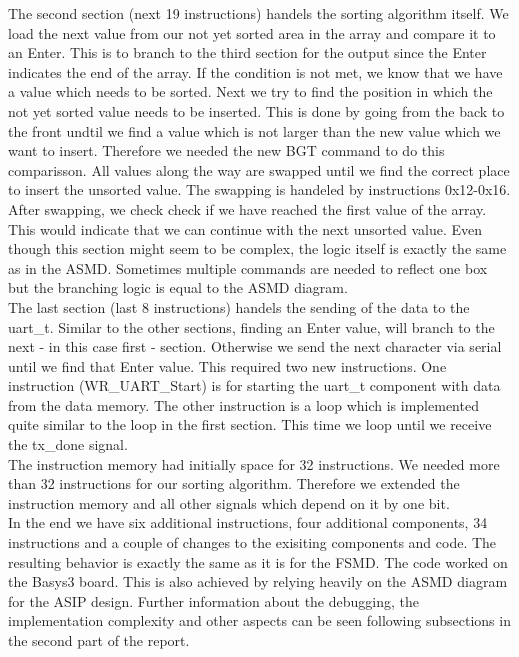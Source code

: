 \documentclass[conference]{IEEEtran}
\begin{document}
The second section (next 19 instructions) handels the sorting algorithm itself. We load the next value from our not yet sorted area in the array and compare it to an Enter. This is to branch to the third section for the output since the Enter indicates the end of the array. If the condition is not met, we know that we have a value which needs to be sorted. Next we try to find the position in which the not yet sorted value needs to be inserted. This is done by going from the back to the front undtil we find a value which is not larger than the new value which we want to insert. Therefore we needed the new BGT command to do this comparisson. All values along the way are swapped until we find the correct place to insert the unsorted value. The swapping is handeled by instructions 0x12-0x16. After swapping, we check check if we have reached the first value of the array. This would indicate that we can continue with the next unsorted value. Even though this section might seem to be complex, the logic itself is exactly the same as in the ASMD. Sometimes multiple commands are needed to reflect one box but the branching logic is equal to the ASMD diagram. \\
The last section (last 8 instructions) handels the sending of the data to the uart\_t. Similar to the other sections, finding an Enter value, will branch to the next - in this case first - section. Otherwise we send the next character via serial until we find that Enter value. This required two new instructions. One instruction (WR\_UART\_Start) is for starting the uart\_t component with data from the data memory. The other instruction is a loop which is implemented quite similar to the loop in the first section. This time we loop until we receive the tx\_done signal.\\
The instruction memory had initially space for 32 instructions. We needed more than 32 instructions for our sorting algorithm. Therefore we extended the instruction memory and all other signals which depend on it by one bit. \\
In the end we have six additional instructions, four additional components, 34 instructions and a couple of changes to the exisiting components and code. The resulting behavior is exactly the same as it is for the FSMD. The code worked on the Basys3 board. This is also achieved by relying heavily on the ASMD diagram for the ASIP design. Further information about the debugging, the implementation complexity and other aspects can be seen following subsections in the second part of the report. \\
\end{document}
